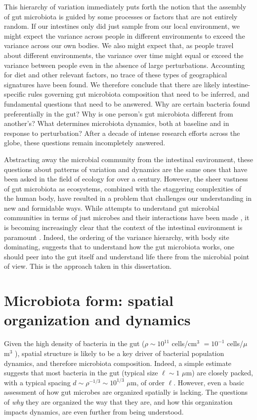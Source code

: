 This hierarchy of variation immediately puts forth the notion that the assembly of gut microbiota is guided by some processes or factors that are not entirely random. If our intestines only did just sample from our local environment, we might expect the variance across people in different environments to exceed the variance across our own bodies. We also might expect that, as people travel about different environments, the variance over time might equal or exceed the variance between people even in the absence of large perturbations. Accounting for diet and other relevant factors, no trace of these types of geographical signatures have been found. We therefore conclude that there are likely intestine-specific rules governing gut microbiota composition that need to be inferred, and fundamental questions that need to be answered. Why are certain bacteria found preferentially in the gut? Why is one person's gut microbiota different from another's? What determines microbiota dynamics, both at baseline and in response to perturbation? After a decade of intense research efforts across the globe, these questions remain incompletely answered. 

Abstracting away the microbial community from the intestinal environment, these questions about patterns of variation and dynamics are the same ones that have been asked in the field of ecology for over a century. However, the sheer vastness of gut microbiota as ecosystems, combined with the staggering complexities of the human body, have resulted in a problem that challenges our understanding in new and formidable ways. While attempts to understand gut microbial communities in terms of just microbes and their interactions have been made \cite{bashan2016universality}, it is becoming increasingly clear that the context of the intestinal environment is paramount \cite{wiles2019other}. Indeed, the ordering of the variance hierarchy, with body site dominating, suggests that to understand how the gut microbiota works, one should peer into the gut itself and understand life there from the microbial point of view. This is the approach taken in this dissertation. 

\section{Microbiota form: spatial organization and dynamics}

Given the high density of bacteria in the gut ($\rho \sim 10^{11}$ cells/cm$^3$ $= 10^{-1}$ cells/$\mu$m$^3$  \cite{sender2016revised}), spatial structure is likely to be a key driver of bacterial population dynamics, and therefore microbiota composition. Indeed, a simple estimate suggests that most bacteria in the gut (typical size $\ell \sim  1$ $\mu$m) are closely packed, with a typical spacing $d \sim \rho^{-1/3} \sim 10^{1/3}$ $\mu$m, of order $\ell$. However, even a basic assessment of how gut microbes are organized spatially is lacking. The questions of \textit{why} they are organized the way that they are, and how this organization impacts dynamics, are even further from being understood.

